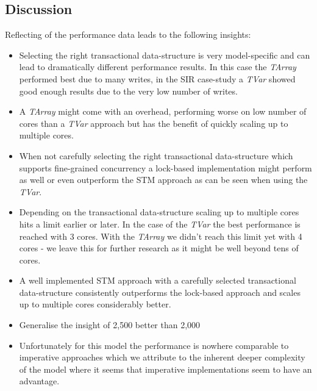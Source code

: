\subsection{Discussion}
Reflecting of the performance data leads to the following insights:
\begin{itemize}	
	\item Selecting the right transactional data-structure is very model-specific and can lead to dramatically different performance results. In this case the \textit{TArray} performed best due to many writes, in the SIR case-study a \textit{TVar} showed good enough results due to the very low number of writes.
	\item A \textit{TArray} might come with an overhead, performing worse on low number of cores than a \textit{TVar} approach but has the benefit of quickly scaling up to multiple cores.
	\item When not carefully selecting the right transactional data-structure which supports fine-grained concurrency a lock-based implementation might perform as well or even outperform the STM approach as can be seen when using the \textit{TVar}.
	\item Depending on the transactional data-structure scaling up to multiple cores hits a limit earlier or later. In the case of the \textit{TVar} the best performance is reached with 3 cores. With the \textit{TArray} we didn't reach this limit yet with 4 cores - we leave this for further research as it might be well beyond tens of cores.
	\item A well implemented STM approach with a  carefully selected transactional data-structure consistently outperforms the lock-based approach and scales up to multiple cores considerably better.
	\item Generalise the insight of 2,500 better than 2,000
	\item Unfortunately for this model the performance is nowhere comparable to imperative approaches which we attribute to the inherent deeper complexity of the model where it seems that imperative implementations seem to have an advantage.
\end{itemize}